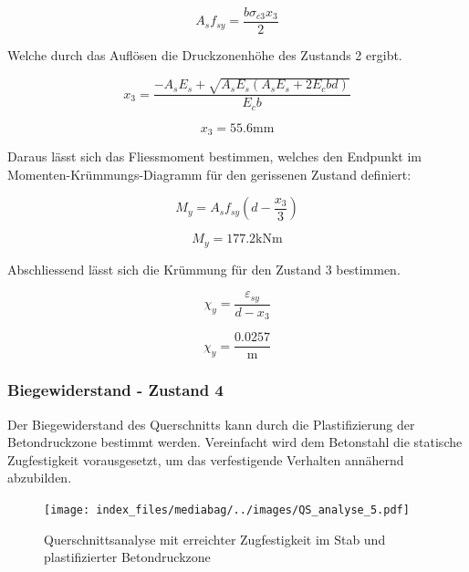 \documentclass[
  12pt,
  letterpaper,
  egregdoesnotlikesansseriftitles]{scrreprt}
\begin{document}
\begin{equation}A_{s} f_{sy} = \frac{b \sigma_{c 3} x_{3}}{2}\end{equation}

Welche durch das Auflösen die Druckzonenhöhe des Zustands 2 ergibt.

\begin{equation}x_{3} = \frac{- A_{s} E_{s} + \sqrt{A_{s} E_{s} \left(A_{s} E_{s} + 2 E_{c} b d\right)}}{E_{c} b}\end{equation}

\begin{equation}x_{3} = 55.6 \text{mm}\end{equation}

Daraus lässt sich das Fliessmoment bestimmen, welches den Endpunkt im
Momenten-Krümmungs-Diagramm für den gerissenen Zustand definiert:

\begin{equation}M_{y} = A_{s} f_{sy} \left(d - \frac{x_{3}}{3}\right)\end{equation}

\begin{equation}M_{y} = 177.2 \text{kN} \text{m}\end{equation}

Abschliessend lässt sich die Krümmung für den Zustand 3 bestimmen.

\begin{equation}\chi_{y} = \frac{\varepsilon_{sy}}{d - x_{3}}\end{equation}

\begin{equation}\chi_{y} = \frac{0.0257}{\text{m}}\end{equation}

\hypertarget{biegewiderstand---zustand-4}{%
\subsubsection{Biegewiderstand - Zustand
4}\label{biegewiderstand---zustand-4}}

Der Biegewiderstand des Querschnitts kann durch die Plastifizierung der
Betondruckzone bestimmt werden. Vereinfacht wird dem Betonstahl die
statische Zugfestigkeit vorausgesetzt, um das verfestigende Verhalten
annähernd abzubilden.

\begin{figure}[H]

{\centering \texttt{[image: index\_files/mediabag/../images/QS\_analyse\_5.pdf]}

}

\caption{\label{fig-qs5}Querschnittsanalyse mit erreichter Zugfestigkeit
im Stab und plastifizierter Betondruckzone}

\end{figure}
\end{document}
